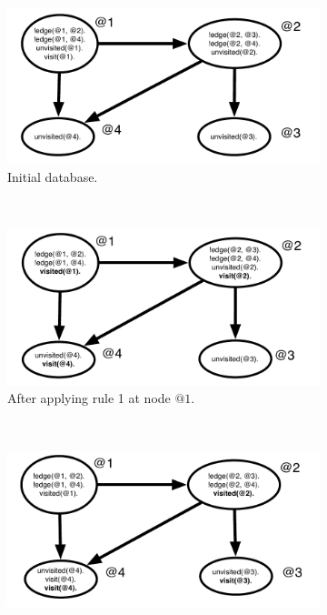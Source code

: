\begin{figure}[h]
        \centering
        \begin{subfigure}[b]{0.5\textwidth}
                \includegraphics[width=\textwidth]{execution_trace1}
                \caption{Initial database.}
                \label{fig:exec_trace1}
        \end{subfigure}%
        ~ %
        \begin{subfigure}[b]{0.5\textwidth}
                \includegraphics[width=\textwidth]{execution_trace2}
                \caption{After applying rule 1 at node $@1$.}
                \label{fig:exec_trace2}
        \end{subfigure}\\
        \begin{subfigure}[b]{0.5\textwidth}
                \includegraphics[width=\textwidth]{execution_trace3}

\end{subfigure}
\end{figure}
